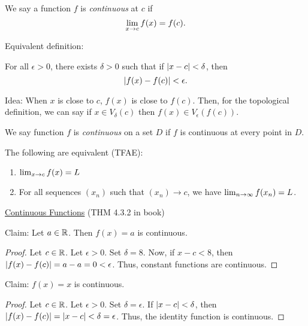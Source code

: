 \begin{definition}
    We say a function \(f\) is \textit{continuous} at \(c\) if
    \[
        \lim_{x \rightarrow c}f(x) = f(c).
    \]

    Equivalent definition:

    For all \(\epsilon > 0\), there exists \(\delta > 0\) such that if \(\left|x - c\right| < \delta\), then
    \[
        \left|f(x) - f(c)\right| < \epsilon.
    \]
\end{definition}

Idea: When \(x\) is close to \(c\), \(f(x)\) is close to \(f(c)\). Then, for the topological definition, we can say if \(x \in V_\delta(c)\) then \(f(x) \in V_\epsilon(f(c))\).

\begin{definition}
    We say function \(f\) is \textit{continuous} on a set \(D\) if \(f\) is continuous at every point in \(D\). 
\end{definition}

The following are equivalent (TFAE):

\begin{enumerate}
    \item \(\lim_{x \rightarrow c}f(x) = L\)
    \item For all sequences \((x_n)\) such that \((x_n) \rightarrow c\), we have \(\lim_{n \rightarrow \infty}f(x_n) = L\).
\end{enumerate}

\begin{center}
    \underline{Continuous Functions} (THM 4.3.2 in book)
\end{center}

Claim: Let \(a \in \mathbb{R}\). Then \(f(x) = a\) is continuous.

\begin{customframedproof}[linecolor=xgray]
    \begin{proof}
        Let \(c \in \mathbb{R}\). Let \(\epsilon > 0\). Set \(\delta = 8\). Now, if \(x - c < 8\), then \(\left|f(x) - f(c)\right| = a - a = 0 < \epsilon\). Thus, constant functions are continuous.
    \end{proof}
\end{customframedproof}

Claim: \(f(x) = x\) is continuous.

\begin{customframedproof}[linecolor=xgray]
    \begin{proof}
        Let \(c \in \mathbb{R}\). Let \(\epsilon > 0\). Set \(\delta = \epsilon\). If \(\left|x - c\right| < \delta\), then \(\left|f(x) - f(c)\right| = \left|x - c\right| < \delta = \epsilon\). Thus, the identity function is continuous.
    \end{proof}
\end{customframedproof}

